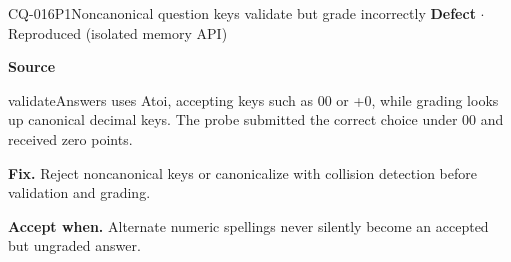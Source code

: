 \begin{finding}{CQ-016}{P1}{Noncanonical question keys validate but grade incorrectly}
\textbf{Defect} $\cdot$ Reproduced (isolated memory API)\par
\textbf{Source}\quad{}\par
validateAnswers uses Atoi, accepting keys such as 00 or +0, while grading looks up canonical decimal keys. The probe submitted the correct choice under 00 and received zero points.\par
\textbf{Fix.} Reject noncanonical keys or canonicalize with collision detection before validation and grading.\par
\textbf{Accept when.} Alternate numeric spellings never silently become an accepted but ungraded answer.
\end{finding}
\clearpage
